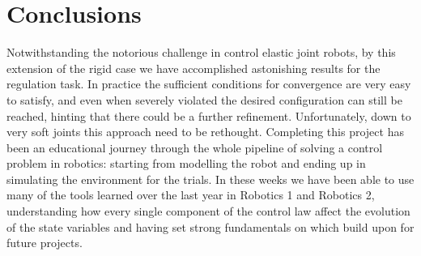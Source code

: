 \section*{Conclusions}
Notwithstanding the notorious challenge in control elastic joint robots, by this extension of the rigid case we have accomplished astonishing results for the regulation task. In practice the sufficient conditions for convergence are very easy to satisfy, and even when severely violated the desired configuration can still be reached, hinting that there could be a further refinement. Unfortunately, down to very soft joints this approach need to be rethought. Completing this project has been an educational journey through the whole pipeline of solving a control problem in robotics: starting from modelling the robot and ending up in simulating the environment for the trials. In these weeks we have been able to use many of the tools learned over the last year in Robotics 1 and Robotics 2, understanding how every single component of the control law affect the evolution of the state variables and having set strong fundamentals on which build upon for future projects. 